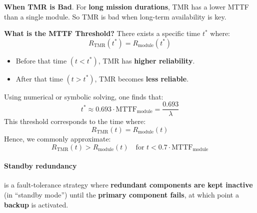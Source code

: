 \highspace
\textcolor{Red2}{ \textbf{When TMR is Bad}}. For \textbf{long mission durations}, TMR has a lower MTTF than a single module. So TMR is bad when long-term availability is key.

\highspace
\textcolor{Green3}{ \textbf{What is the MTTF Threshold?}} There exists a specific time $t^{*}$ where:
\begin{equation*}
    R_{\text{TMR}}\left(t^{*}\right) = R_{\text{module}}\left(t^{*}\right)
\end{equation*}
\begin{itemize}
    \item Before that time $\left(t < t^{*}\right)$, TMR has \textbf{higher reliability}.
    \item After that time $\left(t > t^{*}\right)$, TMR becomes \textbf{less reliable}.
\end{itemize}
Using numerical or symbolic solving, one finds that:
\begin{equation*}
    t^{*} \approx 0.693 \cdot \text{MTTF}_{\text{module}} = \dfrac{0.693}{\lambda}
\end{equation*}
This threshold corresponds to the time where:
\begin{equation*}
    R_{\text{TMR}}\left(t\right) = R_{\text{module}}\left(t\right)
\end{equation*}
Hence, we commonly approximate:
\begin{equation}
    R_{\text{TMR}}\left(t\right) > R_{\text{module}}\left(t\right) \quad \text{for } t < 0.7 \cdot \text{MTTF}_{\text{module}}
\end{equation}

\newpage

\paragraph{Standby redundancy}

 is a fault-tolerance strategy where \textbf{redundant components are kept inactive} (in ``standby mode'') until the \textbf{primary component fails}, at which point a \textbf{backup} is activated.


